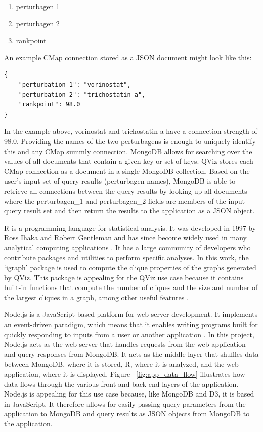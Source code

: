 \documentclass[12pt]{article}
\begin{document}
\begin{enumerate}
\item perturbagen 1
\item perturbagen 2
\item rankpoint
\end{enumerate}

An example CMap connection stored as a JSON document might look like this:

\begin{lstlisting}
{
	"perturbation_1": "vorinostat",
	"perturbation_2": "trichostatin-a",
	"rankpoint": 98.0
}
\end{lstlisting}
	
In the example above, vorinostat and trichostatin-a have a connection strength of 98.0. Providing the names of the two perturbagens is enough to uniquely identify this and any CMap summly connection. MongoDB allows for searching over the values of all documents that contain a given key or set of keys. QViz stores each CMap connection as a document in a single MongoDB collection. Based on the user's input set of query results (perturbagen names), MongoDB is able to retrieve all connections between the query results by looking up all documents where the perturbagen\_1 and perturbagen\_2 fields are members of the input query result set and then return the results to the application as a JSON object.

R is a programming language for statistical analysis. It was developed in 1997 by Ross Ihaka and Robert Gentleman and has since become widely used in many analytical computing applications \cite{r_lang}. It has a large community of developers who contribute packages and utilities to perform specific analyses. In this work, the `igraph' package is used to compute the clique properties of the graphs generated by QViz. This package is appealing for the QViz use case because it contains built-in functions that compute the number of cliques and the size and number of the largest cliques in a graph, among other useful features \cite{igraph}.

Node.js is a JavaScript-based platform for web server development. It implements an event-driven paradigm, which means that it enables writing programs built for quickly responding to inputs from a user or another application \cite{node}. In this project, Node.js acts as the web server that handles requests from the web application and query responses from MongoDB. It acts as the middle layer that shuffles data between MongoDB, where it is stored, R, where it is analyzed, and the web application, where it is displayed. Figure ~\ref{fig:app_data_flow} illustrates how data flows through the various front and back end layers of the application. Node.js is appealing for this use case because, like MongoDB and D3, it is based in JavaScript. It therefore allows for easily passing query parameters from the application to MongoDB and query results as JSON objects from MongoDB to the application.
\end{document}
